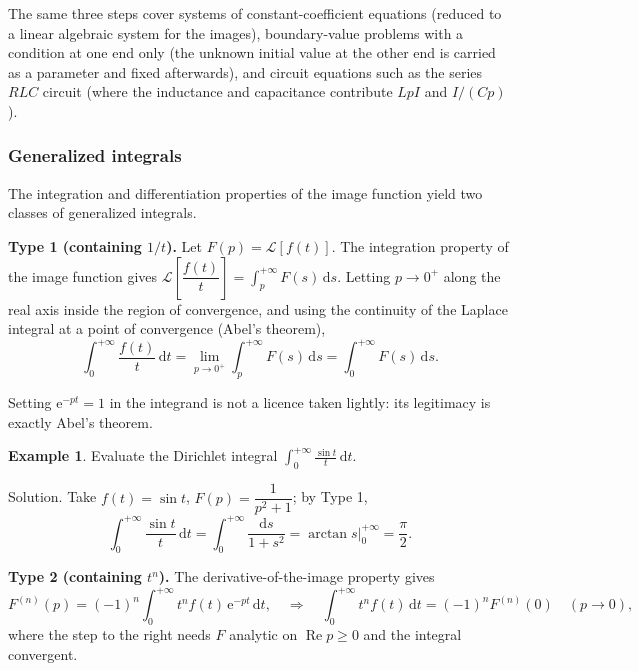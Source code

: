 \documentclass[11pt,a4paper]{article}
\theoremstyle{definition}
\newtheorem{example}{Example}[section]
\theoremstyle{plain}
\begin{document}
The same three steps cover systems of constant-coefficient equations (reduced to a linear algebraic
system for the images), boundary-value problems with a condition at one end only (the unknown
initial value at the other end is carried as a parameter and fixed afterwards), and circuit
equations such as the series $RLC$ circuit (where the inductance and capacitance contribute $LpI$
and $I/(Cp)$).

\subsubsection{Generalized integrals}

The integration and differentiation properties of the image function yield two classes of
generalized integrals.

\textbf{Type 1 (containing $1/t$).} Let $F(p)=\mathcal{L}[f(t)]$. The integration property of the
image function gives $\mathcal{L}\left[\dfrac{f(t)}{t}\right]
=\displaystyle\int_{p}^{+\infty}F(s)\,\mathrm{d}s$. Letting $p\to 0^{+}$ along the real axis inside
the region of convergence, and using the continuity of the Laplace integral at a point of
convergence (Abel's theorem),
\begin{equation*}
\int_{0}^{+\infty}\frac{f(t)}{t}\,\mathrm{d}t
=\lim_{p\to 0^{+}}\int_{p}^{+\infty}F(s)\,\mathrm{d}s
=\int_{0}^{+\infty}F(s)\,\mathrm{d}s .
\end{equation*}

Setting $\mathrm{e}^{-pt}=1$ in the integrand is not a licence taken lightly: its legitimacy is
exactly Abel's theorem.

\begin{example}
Evaluate the Dirichlet integral
$\displaystyle\int_{0}^{+\infty}\frac{\sin t}{t}\,\mathrm{d}t$.
\end{example}

Solution. Take $f(t)=\sin t$, $F(p)=\dfrac{1}{p^2+1}$; by Type 1,
\begin{equation*}
\int_{0}^{+\infty}\frac{\sin t}{t}\,\mathrm{d}t
=\int_{0}^{+\infty}\frac{\mathrm{d}s}{1+s^2}
=\left.\arctan s\right|_{0}^{+\infty}=\frac{\pi}{2} .
\end{equation*}

\textbf{Type 2 (containing $t^{n}$).} The derivative-of-the-image property gives
\begin{equation*}
F^{(n)}(p)=(-1)^{n}\int_{0}^{+\infty}t^{n}f(t)\,\mathrm{e}^{-pt}\,\mathrm{d}t ,
\quad\Longrightarrow\quad
\int_{0}^{+\infty}t^{n}f(t)\,\mathrm{d}t=(-1)^{n}F^{(n)}(0)\quad(p\to 0),
\end{equation*}
where the step to the right needs $F$ analytic on $\operatorname{Re}p\ge 0$ and the integral
convergent.
\end{document}
